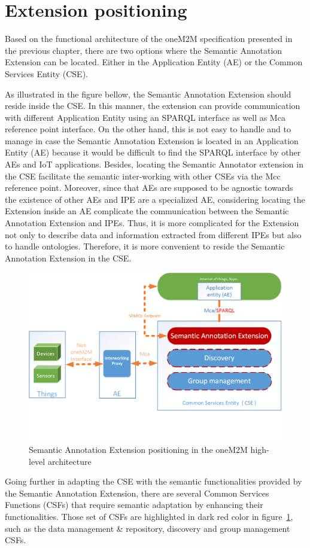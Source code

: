 \section{Extension positioning}
Based on the functional architecture of the oneM2M specification presented in the previous chapter, there are two options where the Semantic Annotation Extension can be located. Either in the Application Entity (AE) or the Common Services Entity (CSE). \par
As illustrated in the figure bellow, the Semantic Annotation Extension should reside inside the CSE. In this manner, the extension can provide communication with different Application Entity using an SPARQL interface as well as Mca reference point interface. On the other hand, this is not easy to handle and to manage in case the Semantic Annotation Extension is located in an Application Entity (AE) because it would be difficult to find the SPARQL interface by other AEs and IoT applications. Besides, locating the Semantic Annotator extension in the CSE facilitate the semantic inter-working with other CSEs via the Mcc reference point. Moreover, since that AEs are supposed to be agnostic towards the existence of other AEs and IPE are a specialized AE, considering locating the Extension inside an AE complicate the communication between the Semantic Annotation Extension and IPEs. Thus, it is more complicated for the Extension not only to describe data and information extracted from different IPEs but also to handle ontologies. Therefore, it is more convenient to reside the Semantic Annotation Extension in the CSE.


\begin{figure}[htbp]
    \centering
    \includegraphics[width=1.\textwidth]{resources/images/positioning}
    \caption{Semantic Annotation Extension positioning in the oneM2M high-level architecture }\label{fig:contrib2:high}
\end{figure}
Going further in adapting the CSE with the semantic functionalities provided by the Semantic Annotation Extension, there are several Common Services Functions (CSFs) that require semantic adaptation by enhancing their functionalities. Those set of CSFs are highlighted in dark red color in figure~\ref{fig:contrib2:high}, such as the data management & repository, discovery and group management CSFs.

